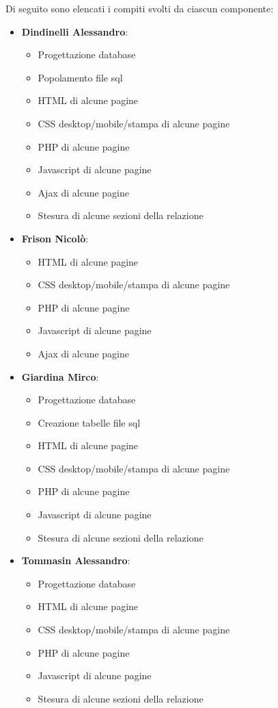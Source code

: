 \documentclass{article}
\begin{document}
		\vspace{0.5cm}
		Di seguito sono elencati i compiti svolti da ciascun componente:
		\begin{itemize}
			\item{\bfseries Dindinelli Alessandro}:
				\begin{itemize}
					\item Progettazione database
					\item Popolamento file sql
					\item HTML di alcune pagine
					\item CSS desktop/mobile/stampa di alcune pagine
					\item PHP di alcune pagine
					\item Javascript di alcune pagine
					\item Ajax di alcune pagine
					\item Stesura di alcune sezioni della relazione
				\end{itemize}
			\item{\bfseries Frison Nicolò}:
				\begin{itemize}
					\item HTML di alcune pagine
					\item CSS desktop/mobile/stampa di alcune pagine
					\item PHP di alcune pagine
					\item Javascript di alcune pagine
					\item Ajax di alcune pagine
				\end{itemize}
			\item{\bfseries Giardina Mirco}:
				\begin{itemize}
					\item Progettazione database
					\item Creazione tabelle file sql
					\item HTML di alcune pagine
					\item CSS desktop/mobile/stampa di alcune pagine
					\item PHP di alcune pagine
					\item Javascript di alcune pagine
					\item Stesura di alcune sezioni della relazione
				\end{itemize}
			\item{\bfseries Tommasin Alessandro}:
				\begin{itemize}
					\item Progettazione database
					\item HTML di alcune pagine
					\item CSS desktop/mobile/stampa di alcune pagine
					\item PHP di alcune pagine
					\item Javascript di alcune pagine
					\item Stesura di alcune sezioni della relazione
				\end{itemize}
		\end{itemize}
\end{document}
